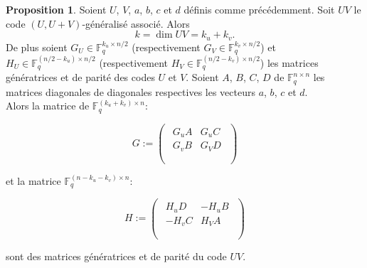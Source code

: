 \documentclass[12pt]{article}
\theoremstyle{definition}
\newtheorem{propo}[thm]{Proposition}
\newcommand{\F}{\mathbb{F}}
\begin{document}
\begin{propo} Soient $U$, $V$, $a$, $b$, $c$ et $d$ définis comme précédemment. Soit $UV$ le code $(U,U+V)$-généralisé associé. Alors
$$ k = \dim UV = k_u + k_v.$$
De plus soient $G_U \in \F_q^{k_u \times n/2}$ (respectivement $G_V \in \F_q^{k_v \times n/2}$) et $H_U \in \F_q^{(n/2-k_u) \times n/2}$ (respectivement $H_V \in \F_q^{(n/2-k_v) \times n/2}$) les matrices génératrices et de parité des codes $U$ et $V$. Soient $A$, $B$, $C$, $D$ de $\F_q^{n \times n}$ les matrices diagonales de diagonales respectives les vecteurs $a$, $b$, $c$ et $d$.  \\
\vspace{0.2in}
Alors la matrice de $\F_q^{(k_u + k_v) \times n}$: 

\vspace{0.1in}

$$
G := 
\begin{pmatrix}
\begin{array}{c|c}
G_uA & G_uC \\
 \hline 
G_vB & G_VD \\
\end{array} \\
\end{pmatrix}
$$

\noindent et la matrice $\F_q^{(n - k_u - k_v) \times n}$:

\vspace{0.1in}
$$ 
H :=
\begin{pmatrix}
\begin{array}{c|c}
H_uD & -H_uB \\
 \hline 
-H_vC & H_VA \\
\end{array} \\
\end{pmatrix}
$$
\vspace{0.1in}

\noindent sont des matrices génératrices et de parité du code $UV$. 
\end{propo}
\end{document}
